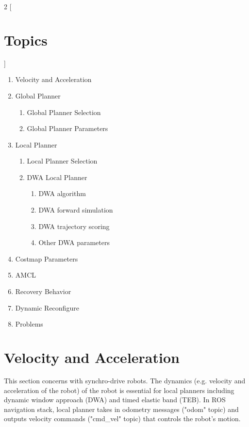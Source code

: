 \documentclass[12pt]{article}
\begin{document}
\begin{multicols}{2}
[
\section*{Topics}
]
    \begin{flushleft}
        \begin{enumerate}
            \item Velocity and Acceleration\\
            \item Global Planner\\
            \begin{enumerate}
              \item Global Planner Selection
              \item Global Planner Parameters
            \end{enumerate}
            \item Local Planner\\
            \begin{enumerate}
              \item Local Planner Selection
              \item DWA Local Planner
                \begin{enumerate}
                    \item DWA algorithm
                    \item DWA forward simulation
                    \item DWA trajectory scoring
                    \item Other DWA parameters
                \end{enumerate}
            \end{enumerate}
            \item Costmap Parameters
            \item AMCL
            \item Recovery Behavior
            \item Dynamic Reconfigure
            \item Problems
        \end{enumerate}
    \end{flushleft}
\end{multicols}


\newpage

\section{Velocity and Acceleration}
This section concerns with synchro-drive robots. The dynamics (e.g. velocity and acceleration of the robot) of the robot is essential for local planners including dynamic window approach (DWA) and timed elastic band (TEB). In ROS navigation stack, local planner
takes in odometry messages ("odom" topic) and outputs velocity commands ("cmd\_vel" topic) that controls the robot's motion. \\
\end{document}
